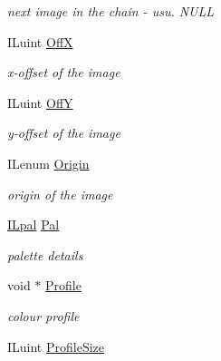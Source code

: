 \begin{DoxyCompactItemize}
\begin{DoxyCompactList}\small\item\em next image in the chain -\/ usu. N\+U\+L\+L \end{DoxyCompactList}\item 
\hypertarget{struct_i_limage_a891d8d9dbdfb70a6c65917e0c0840fe3}{I\+Luint \hyperlink{struct_i_limage_a891d8d9dbdfb70a6c65917e0c0840fe3}{Off\+X}}\label{struct_i_limage_a891d8d9dbdfb70a6c65917e0c0840fe3}

\begin{DoxyCompactList}\small\item\em x-\/offset of the image \end{DoxyCompactList}\item 
\hypertarget{struct_i_limage_a12261addd01c7aaa40f2c0976e7c688c}{I\+Luint \hyperlink{struct_i_limage_a12261addd01c7aaa40f2c0976e7c688c}{Off\+Y}}\label{struct_i_limage_a12261addd01c7aaa40f2c0976e7c688c}

\begin{DoxyCompactList}\small\item\em y-\/offset of the image \end{DoxyCompactList}\item 
\hypertarget{struct_i_limage_a6f7c49ddc9cd419e2d2af24255df902a}{I\+Lenum \hyperlink{struct_i_limage_a6f7c49ddc9cd419e2d2af24255df902a}{Origin}}\label{struct_i_limage_a6f7c49ddc9cd419e2d2af24255df902a}

\begin{DoxyCompactList}\small\item\em origin of the image \end{DoxyCompactList}\item 
\hypertarget{struct_i_limage_a689bdcea4bd95419044f5d0bd992dc3b}{\hyperlink{struct_i_lpal}{I\+Lpal} \hyperlink{struct_i_limage_a689bdcea4bd95419044f5d0bd992dc3b}{Pal}}\label{struct_i_limage_a689bdcea4bd95419044f5d0bd992dc3b}

\begin{DoxyCompactList}\small\item\em palette details \end{DoxyCompactList}\item 
\hypertarget{struct_i_limage_a600ef5a56ced202093cd70df3256bf16}{void $\ast$ \hyperlink{struct_i_limage_a600ef5a56ced202093cd70df3256bf16}{Profile}}\label{struct_i_limage_a600ef5a56ced202093cd70df3256bf16}

\begin{DoxyCompactList}\small\item\em colour profile \end{DoxyCompactList}\item 
\hypertarget{struct_i_limage_a05f25f2e1b5f2eb1beb3fd4440d852a1}{I\+Luint \hyperlink{struct_i_limage_a05f25f2e1b5f2eb1beb3fd4440d852a1}{Profile\+Size}}\label{struct_i_limage_a05f25f2e1b5f2eb1beb3fd4440d852a1}


\end{DoxyCompactItemize}
